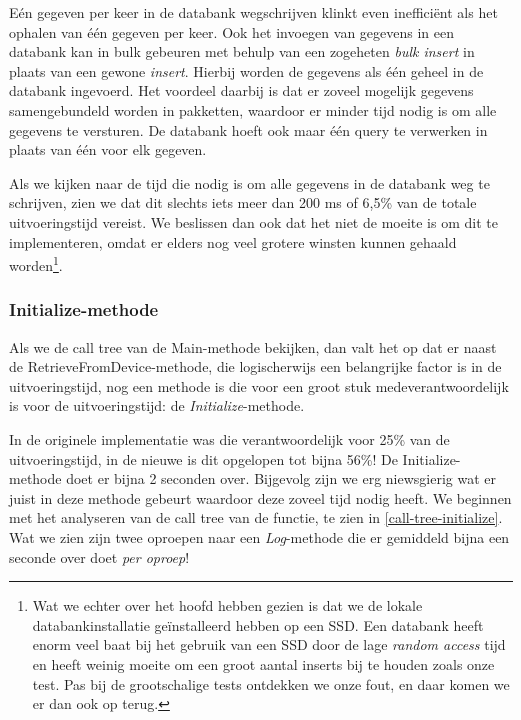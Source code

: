 Eén gegeven per keer in de databank wegschrijven klinkt even inefficiënt als het ophalen van één gegeven per keer.
Ook het invoegen van gegevens in een databank kan in bulk gebeuren met behulp van een zogeheten \textit{bulk insert} in plaats van een gewone \textit{insert}.
Hierbij worden de gegevens als één geheel in de databank ingevoerd.
Het voordeel daarbij is dat er zoveel mogelijk gegevens samengebundeld worden in pakketten, waardoor er minder tijd nodig is om alle gegevens te versturen.
De databank hoeft ook maar één query te verwerken in plaats van één voor elk gegeven.

Als we kijken naar de tijd die nodig is om alle gegevens in de databank weg te schrijven, zien we dat
dit slechts iets meer dan 200 ms of 6,5\% van de totale uitvoeringstijd vereist.
We beslissen dan ook dat het niet de moeite is om dit te implementeren, omdat er elders nog veel grotere winsten kunnen gehaald worden\footnote{
	Wat we echter over het hoofd hebben gezien is dat we de lokale databankinstallatie geïnstalleerd hebben op een SSD.
	Een databank heeft enorm veel baat bij het gebruik van een SSD door de lage \textit{random access} tijd en heeft weinig moeite om een groot aantal inserts bij te houden zoals onze test.
	Pas bij de grootschalige tests ontdekken we onze fout, en daar komen we er dan ook op terug.
}.


\subsubsection{Initialize-methode}

Als we de call tree van de Main-methode bekijken, dan valt het op dat er naast de RetrieveFromDevice-methode,
die logischerwijs een belangrijke factor is in de uitvoeringstijd,
nog een methode is die voor een groot stuk medeverantwoordelijk is voor de uitvoeringstijd: de \textit{Initialize}-methode.

In de originele implementatie was die verantwoordelijk voor 25\% van de uitvoeringstijd, in de nieuwe is dit opgelopen tot bijna 56\%!
De Initialize-methode doet er bijna 2 seconden over.
Bijgevolg zijn we erg niewsgierig wat er juist in deze methode gebeurt waardoor deze zoveel tijd nodig heeft.
We beginnen met het analyseren van de call tree van de functie, te zien in \cref{call-tree-initialize}.
Wat we zien zijn twee oproepen naar een \emph{Log}-methode die er gemiddeld bijna een seconde over doet \emph{per oproep}!

